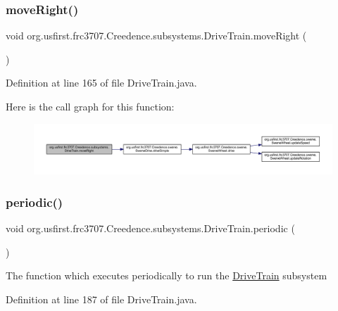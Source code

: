 \subsubsection{\texorpdfstring{moveRight()}{moveRight()}}
{\footnotesize\ttfamily void org.\+usfirst.\+frc3707.\+Creedence.\+subsystems.\+Drive\+Train.\+move\+Right (\begin{DoxyParamCaption}{ }\end{DoxyParamCaption})}



Definition at line 165 of file Drive\+Train.\+java.

Here is the call graph for this function\+:
\nopagebreak
\begin{figure}[H]
\begin{center}
\leavevmode
\includegraphics[width=350pt]{classorg_1_1usfirst_1_1frc3707_1_1_creedence_1_1subsystems_1_1_drive_train_a42e63c6914b8fb47374339004cfbd229_cgraph}
\end{center}
\end{figure}
\mbox{\label{classorg_1_1usfirst_1_1frc3707_1_1_creedence_1_1subsystems_1_1_drive_train_a9c6e1c93fe48fb89c2c57f11653a4827}} 
\subsubsection{\texorpdfstring{periodic()}{periodic()}}
{\footnotesize\ttfamily void org.\+usfirst.\+frc3707.\+Creedence.\+subsystems.\+Drive\+Train.\+periodic (\begin{DoxyParamCaption}{ }\end{DoxyParamCaption})}

The function which executes periodically to run the \mbox{\hyperlink{classorg_1_1usfirst_1_1frc3707_1_1_creedence_1_1subsystems_1_1_drive_train}{Drive\+Train}} subsystem 

Definition at line 187 of file Drive\+Train.\+java.

